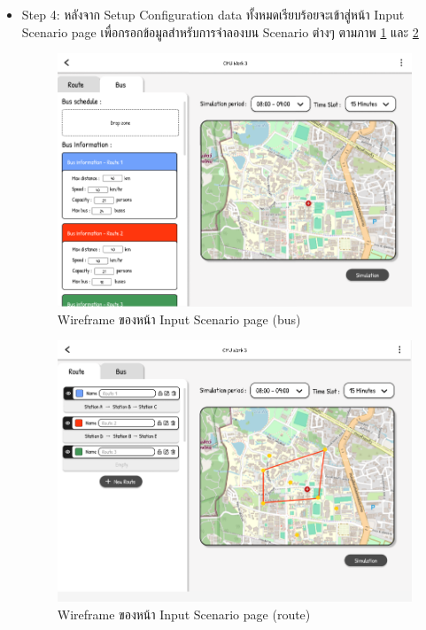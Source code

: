 \begin{mypara}
\begin{itemize}
    \item Step 4: หลังจาก Setup Configuration data ทั้งหมดเรียบร้อยจะเข้าสู่หน้า Input Scenario page 
    เพื่อกรอกข้อมูลสำหรับการจำลองบน Scenario ต่างๆ ตามภาพ \ref{fig:WireframeInputGuest} และ \ref{fig:WireframeInputRouteGuest}
      \begin{figure}[H]
        \centering
        \includegraphics[scale=0.4]{input_bus.png}
        \caption{Wireframe ของหน้า Input Scenario page (bus) }
        \label{fig:WireframeInputGuest}
      \end{figure}
      \begin{figure}[H]
        \centering
        \includegraphics[scale=0.4]{input_route.png}
        \caption{Wireframe ของหน้า Input Scenario page (route) }
        \label{fig:WireframeInputRouteGuest}
      \end{figure}


\end{itemize}
\end{mypara}

